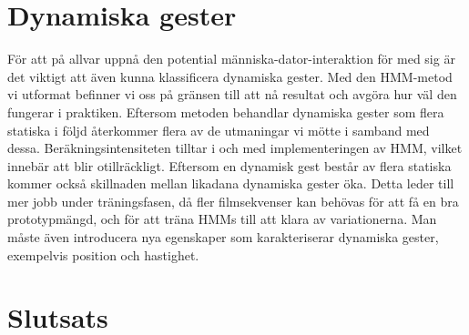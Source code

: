 \documentclass[../rapport_MVEX01-11-05]{subfiles}
\begin{document}
\section{Dynamiska gester}
För att på allvar uppnå den potential människa-dator-interaktion för med sig
är det viktigt att även kunna klassificera dynamiska gester. Med den HMM-metod 
vi utformat befinner vi oss på gränsen till att nå resultat och avgöra hur väl 
den fungerar i praktiken. Eftersom metoden behandlar dynamiska gester som flera 
statiska i följd återkommer flera av de utmaningar vi mötte i samband med dessa. 
Beräkningsintensiteten tilltar i och med implementeringen av HMM, vilket innebär 
att \MATLAB blir otillräckligt. Eftersom en dynamisk gest består av flera statiska
kommer också skillnaden mellan likadana dynamiska gester öka. Detta leder till 
mer jobb under träningsfasen, då fler filmsekvenser kan behövas för att få en 
bra prototypmängd, och för att träna HMMs till att klara av variationerna. 
Man måste även introducera nya egenskaper som karakteriserar dynamiska gester, 
exempelvis position och hastighet. 




\section{Slutsats}
\end{document}
